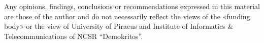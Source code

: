 \vspace{0.8cm}

\begin{flushleft}
    Any opinions, findings, conclusions or recommendations expressed in this material are those of the author and do not necessarily reflect the views of the «funding body» or the view of University of Piraeus and Institute of Informatics \& Telecommunications of NCSR “Demokritos”. 
\end{flushleft}